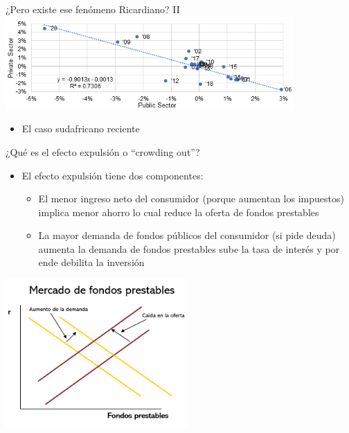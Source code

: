 \documentclass{beamer}
\begin{document}
\begin{frame}{¿Pero existe ese fenómeno Ricardiano? II}
     \centering\includegraphics[width=11cm]{Figures/C36.11.png}\  
\begin{itemize}
    \item El caso sudafricano reciente
    \end{itemize}
\end{frame}

\begin{frame}{¿Qué es el efecto expulsión o “crowding out”?}
    \begin{itemize}
    \footnotesize\item El efecto expulsión tiene dos componentes:
        \begin{itemize}
        \scriptsize\item El menor ingreso neto del consumidor (porque aumentan los impuestos) implica menor ahorro lo cual reduce la oferta de fondos prestables
        \scriptsize\item La mayor demanda de fondos públicos del consumidor (si pide deuda) aumenta la demanda de fondos prestables sube la tasa de interés y por ende debilita la inversión
        \scriptsize\end{itemize}
    \end{itemize}
    \vspace{0.2cm}
    \centering\includegraphics[width=7cm]{P87.png}\
\end{frame}
\end{document}
